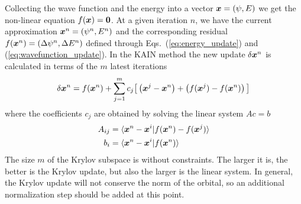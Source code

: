 Collecting the wave function and the energy into a vector $\boldsymbol x = (\psi,E)$ we 
get the non-linear equation $f(\boldsymbol x) = \boldsymbol 0$. At a given iteration $n$, we have the 
current approximation $\boldsymbol x^n = (\psi^n,E^n)$ and the corresponding residual 
$f(\boldsymbol x^n) = (\Delta \psi^n,\Delta E^n)$ defined through 
Eqs.~(\ref{eq:energy_update}) and (\ref{eq:wavefunction_update}). In the KAIN method the
new update $\delta\boldsymbol x^n$ is calculated in terms of the $m$ latest iterations
\begin{equation}
    \label{eq:KAIN_update}
    \delta \boldsymbol x^n = f(\boldsymbol x^n) + \sum_{j=1}^m c_j 
	\big[\left(\boldsymbol x^{j}-\boldsymbol x^{n}\right) + \left(f(\boldsymbol x^j)-f(\boldsymbol x^{n})\right)\big] 
\end{equation}
where the coefficients $c_j$ are obtained by solving the linear system $Ac=b$ 
\begin{align}
    A_{ij} &= \langle\boldsymbol x^n - \boldsymbol x^i|
		f(\boldsymbol x^n) - f(\boldsymbol x^j)\rangle\\
    b_{i}   &= \langle\boldsymbol x^n - \boldsymbol x^i | f(\boldsymbol x^n)\rangle
\end{align}
The size $m$ of the Krylov subspace is without constraints. The larger it is, 
the better is the Krylov update, but also the larger is the linear system. In 
general, the Krylov update will not conserve the norm of the orbital, so an 
additional normalization step should be added at this point.

